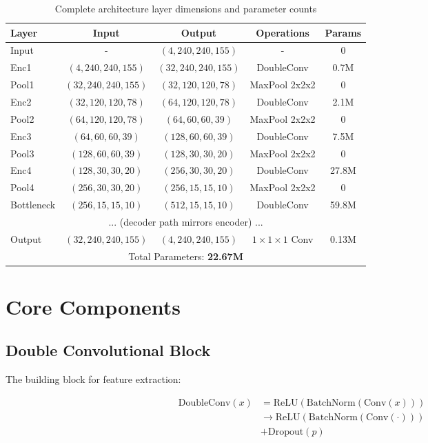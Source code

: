 \documentclass{ecsproject}     %
\begin{document}
\begin{table}[h]
\centering
\begin{tabular}{|l|c|c|c|c|}
\hline
\textbf{Layer} & \textbf{Input} & \textbf{Output} & \textbf{Operations} & \textbf{Params} \\
\hline
Input & - & $(4, 240, 240, 155)$ & - & 0 \\
\hline
Enc1 & $(4, 240, 240, 155)$ & $(32, 240, 240, 155)$ & DoubleConv & 0.7M \\
Pool1 & $(32, 240, 240, 155)$ & $(32, 120, 120, 78)$ & MaxPool 2x2x2 & 0 \\
\hline
Enc2 & $(32, 120, 120, 78)$ & $(64, 120, 120, 78)$ & DoubleConv & 2.1M \\
Pool2 & $(64, 120, 120, 78)$ & $(64, 60, 60, 39)$ & MaxPool 2x2x2 & 0 \\
\hline
Enc3 & $(64, 60, 60, 39)$ & $(128, 60, 60, 39)$ & DoubleConv & 7.5M \\
Pool3 & $(128, 60, 60, 39)$ & $(128, 30, 30, 20)$ & MaxPool 2x2x2 & 0 \\
\hline
Enc4 & $(128, 30, 30, 20)$ & $(256, 30, 30, 20)$ & DoubleConv & 27.8M \\
Pool4 & $(256, 30, 30, 20)$ & $(256, 15, 15, 10)$ & MaxPool 2x2x2 & 0 \\
\hline
Bottleneck & $(256, 15, 15, 10)$ & $(512, 15, 15, 10)$ & DoubleConv & 59.8M \\
\hline
\multicolumn{5}{|c|}{... (decoder path mirrors encoder) ...} \\
\hline
Output & $(32, 240, 240, 155)$ & $(4, 240, 240, 155)$ & $1\times1\times1$ Conv & 0.13M \\
\hline
\multicolumn{5}{|c|}{Total Parameters: \textbf{22.67M}} \\
\hline
\end{tabular}
\caption{Complete architecture layer dimensions and parameter counts}
\label{Table:Architecture}
\end{table}

\section{Core Components}

\subsection{Double Convolutional Block}

The building block for feature extraction:

\begin{align}
\text{DoubleConv}(x) &= \text{ReLU}(\text{BatchNorm}(\text{Conv}(x))) \\
&\rightarrow \text{ReLU}(\text{BatchNorm}(\text{Conv}(\cdot))) \\
&+ \text{Dropout}(p)
\end{align}
\end{document}
